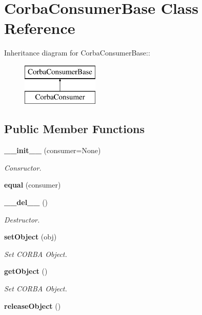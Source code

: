 \section{Corba\-Consumer\-Base Class Reference}
\label{classCorbaConsumerBase}
Inheritance diagram for Corba\-Consumer\-Base::\begin{figure}[H]
\begin{center}
\leavevmode
\includegraphics[height=2cm]{classCorbaConsumerBase}
\end{center}
\end{figure}
\subsection*{Public Member Functions}
\begin{CompactItemize}
\item 
{\bf \_\-\_\-init\_\-\_\-} (consumer=None)
\begin{CompactList}\small\item\em Consructor. \item\end{CompactList}\item 
{\bf equal} (consumer)
\item 
{\bf \_\-\_\-del\_\-\_\-} ()
\begin{CompactList}\small\item\em Destructor. \item\end{CompactList}\item 
{\bf set\-Object} (obj)
\begin{CompactList}\small\item\em Set CORBA Object. \item\end{CompactList}\item 
{\bf get\-Object} ()
\begin{CompactList}\small\item\em Set CORBA Object. \item\end{CompactList}\item 
{\bf release\-Object} ()
\end{CompactItemize}


